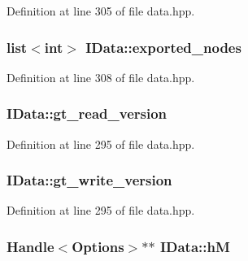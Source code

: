 Definition at line 305 of file data.hpp.\hypertarget{class_i_data_aed01ed7d506a222e39f110b2498e4e08}{
\subsubsection[{exported\_\-nodes}]{\setlength{\rightskip}{0pt plus 5cm}list$<$int$>$ {\bf IData::exported\_\-nodes}}}
\label{class_i_data_aed01ed7d506a222e39f110b2498e4e08}


Definition at line 308 of file data.hpp.\hypertarget{class_i_data_a6c41904f79abd83d922d00557a56d151}{
\subsubsection[{gt\_\-read\_\-version}]{ {\bf IData::gt\_\-read\_\-version}}}
\label{class_i_data_a6c41904f79abd83d922d00557a56d151}


Definition at line 295 of file data.hpp.\hypertarget{class_i_data_a61d3d27cb7379fc3b1666a11b39dda2d}{
\subsubsection[{gt\_\-write\_\-version}]{ {\bf IData::gt\_\-write\_\-version}}}
\label{class_i_data_a61d3d27cb7379fc3b1666a11b39dda2d}


Definition at line 295 of file data.hpp.\hypertarget{class_i_data_a409bcb0fb45a8d4fadc214780ad15470}{
\subsubsection[{hM}]{\setlength{\rightskip}{0pt plus 5cm}Handle$<${\bf Options}$>$$\ast$$\ast$ {\bf IData::hM}}}
\label{class_i_data_a409bcb0fb45a8d4fadc214780ad15470}


